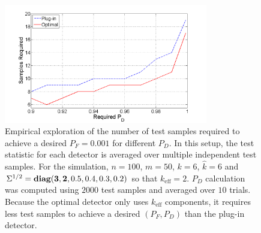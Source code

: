 \begin{figure}
\centering
\includegraphics[width=3.5in]{figures/samples_graph.png}
\caption{Empirical exploration of the number of test samples required to achieve a desired $P_F=0.001$ for different $P_D$. In this setup, the test statistic for each detector is averaged over multiple independent test samples. For the simulation, $n=100$, $m=50$, $k=6$, $\widehat{k}=6$ and $\Sigma^{1/2} = \mathop{\bf diag}({\bf{3,2}},0.5,0.4,0.3,0.2)$ so that $k_{\text{eff}}=2$. $P_D$ calculation was computed using $2000$ test samples and averaged over $10$ trials. Because the optimal detector only uses $k_\text{eff}$ components, it requires less test samples to achieve a desired $(P_F, P_D)$ than the plug-in detector.}
\label{fig:samples}\vskip0.25cm
\end{figure}


%


%
